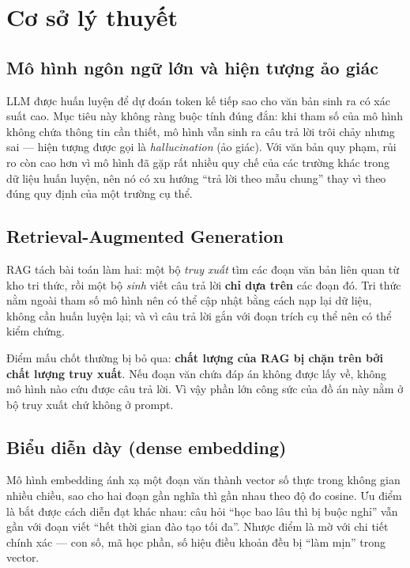 \section{Cơ sở lý thuyết}

\subsection{Mô hình ngôn ngữ lớn và hiện tượng ảo giác}

LLM được huấn luyện để dự đoán token kế tiếp sao cho văn bản sinh ra có xác suất cao. Mục tiêu
này không ràng buộc tính đúng đắn: khi tham số của mô hình không chứa thông tin cần thiết, mô
hình vẫn sinh ra câu trả lời trôi chảy nhưng sai — hiện tượng được gọi là \emph{hallucination}
(ảo giác). Với văn bản quy phạm, rủi ro còn cao hơn vì mô hình đã gặp rất nhiều quy chế của các
trường khác trong dữ liệu huấn luyện, nên nó có xu hướng “trả lời theo mẫu chung” thay vì theo
đúng quy định của một trường cụ thể.

\subsection{Retrieval-Augmented Generation}

RAG \cite{lewis2020} tách bài toán làm hai: một bộ \emph{truy xuất} tìm các đoạn văn bản liên
quan từ kho tri thức, rồi một bộ \emph{sinh} viết câu trả lời \textbf{chỉ dựa trên} các đoạn
đó. Tri thức nằm ngoài tham số mô hình nên có thể cập nhật bằng cách nạp lại dữ liệu, không cần
huấn luyện lại; và vì câu trả lời gắn với đoạn trích cụ thể nên có thể kiểm chứng.

Điểm mấu chốt thường bị bỏ qua: \textbf{chất lượng của RAG bị chặn trên bởi chất lượng truy
xuất}. Nếu đoạn văn chứa đáp án không được lấy về, không mô hình nào cứu được câu trả lời. Vì
vậy phần lớn công sức của đồ án này nằm ở bộ truy xuất chứ không ở prompt.

\subsection{Biểu diễn dày (dense embedding)}

Mô hình embedding ánh xạ một đoạn văn thành vector số thực trong không gian nhiều chiều, sao
cho hai đoạn gần nghĩa thì gần nhau theo độ đo cosine. Ưu điểm là bắt được cách diễn đạt khác
nhau: câu hỏi “học bao lâu thì bị buộc nghỉ” vẫn gần với đoạn viết “hết thời gian đào tạo tối
đa”. Nhược điểm là mờ với chi tiết chính xác — con số, mã học phần, số hiệu điều khoản đều bị
“làm mịn” trong vector.

